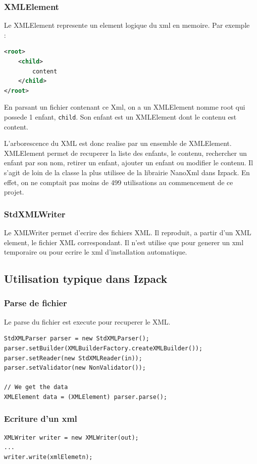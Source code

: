 \subsubsection{XMLElement}
Le XMLElement represente un element logique du xml en memoire. Par exemple :
\begin{lstlisting}[language=xml]
<root>
	<child>
		content
	</child>
</root>
\end{lstlisting}
En parsant un fichier contenant ce Xml, on a un XMLElement nomme root qui possede 1 enfant, \verb|child|. Son enfant est un XMLElement dont le contenu est content.

L'arborescence du XML est donc realise par un ensemble de XMLElement. XMLElement permet de recuperer la liste des enfants, le contenu, rechercher un enfant par son nom, retirer un enfant, ajouter un enfant ou modifier le contenu. Il s'agit de loin de la classe la plus utilisee de la librairie NanoXml dans Izpack. En effet, on ne comptait pas moins de 499 utilisations au commencement de ce projet.
\subsubsection{StdXMLWriter}
Le XMLWriter permet d'ecrire des fichiers XML. Il reproduit, a partir d'un XML element, le fichier XML correspondant. Il n'est utilise que pour generer un xml temporaire ou pour ecrire le xml d'installation automatique. 
\subsection{Utilisation typique dans Izpack}
\subsubsection{Parse de fichier}
Le parse du fichier est execute pour recuperer le XML.
\begin{lstlisting}
StdXMLParser parser = new StdXMLParser();
parser.setBuilder(XMLBuilderFactory.createXMLBuilder());
parser.setReader(new StdXMLReader(in));
parser.setValidator(new NonValidator());

// We get the data
XMLElement data = (XMLElement) parser.parse();
\end{lstlisting}
\subsubsection{Ecriture d'un xml}
\begin{lstlisting}
XMLWriter writer = new XMLWriter(out);
...
writer.write(xmlElemetn);
\end{lstlisting}
